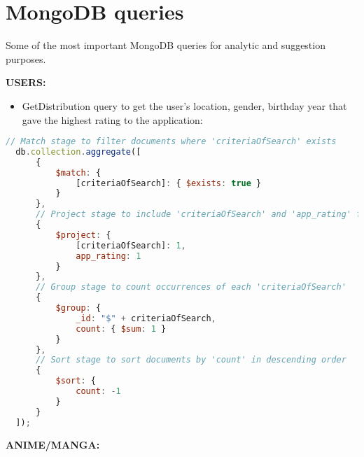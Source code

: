 \section {MongoDB queries}
Some of the most important MongoDB queries for analytic and suggestion purposes. 

\textbf{USERS:}
\begin{itemize}
  \item GetDistribution query to get the user's location, gender, birthday year that gave the highest rating to the application:
  
\end{itemize}
\begin{lstlisting}[language=JavaScript, caption=GetDistribution]
  // Match stage to filter documents where 'criteriaOfSearch' exists
  db.collection.aggregate([
      {
          $match: {
              [criteriaOfSearch]: { $exists: true }
          }
      },
      // Project stage to include 'criteriaOfSearch' and 'app_rating' fields
      {
          $project: {
              [criteriaOfSearch]: 1,
              app_rating: 1
          }
      },
      // Group stage to count occurrences of each 'criteriaOfSearch'
      {
          $group: {
              _id: "$" + criteriaOfSearch,
              count: { $sum: 1 }
          }
      },
      // Sort stage to sort documents by 'count' in descending order
      {
          $sort: {
              count: -1
          }
      }
  ]);
  \end{lstlisting}
  


\textbf{ANIME/MANGA:}


